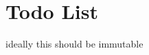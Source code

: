 \chapter{Todo List}
\hypertarget{todo}{}\label{todo}

\begin{DoxyRefList}
\item[Struct \doxylink{structNeoN_1_1la_1_1MatrixView}{NeoN\+::la\+::Matrix\+View\texorpdfstring{$<$}{<} Value\+Type, Sparsity\+View\+Type \texorpdfstring{$>$}{>}} ]\label{todo__todo000001}%
%
ideally this should be immutable 
\end{DoxyRefList}